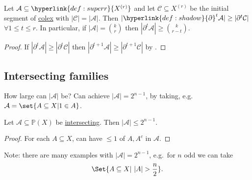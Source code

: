 \documentclass{article}
\newcommand{\A}{\mathcal{A}}
\newcommand{\named}[1]{\textbf{#1}\index{#1}}
\let\subset\subseteq
\begin{document}
\begin{ncor}\label{cor:9}
  Let $\mathcal{A} \subset \hyperlink{def:superr}{X^{(r)}}$ and let $\mathcal{C} \subset X^{(r)}$ be the initial segment of \hyperlink{def:colex}{colex} with $|\mathcal{C}| = |\mathcal{A}|$.
  Then $|\hyperlink{def:shadow}{\partial}^t \mathcal{A}| \geq |\partial^t \mathcal{C}|$ $\forall 1 \leq t \leq r$.
  In particular, if $|\mathcal{A}| = \binom{k}{r}$ then $|\partial^t \mathcal{A}| \geq \binom{k}{r-t}$.
\end{ncor}
\begin{proof}
  If $|\partial^t \mathcal{A}| \geq |\partial^t \mathcal{C}|$ then $|\partial^{t+1} \mathcal{A}| \geq |\partial^{t+1} \mathcal{C}|$ by .
\end{proof}

\subsection{Intersecting families}
How large can $|\mathcal{A}|$ be?
Can achieve $|\mathcal{A}| = 2^{n-1}$, by taking, e.g.\ $\mathcal{A} = \set{A \subset X | 1 \in A}$.
\begin{nprop}\label{prop:10}
  Let $\mathcal{A} \subset \mathbb{P}(X)$ be \hyperlink{def:inter}{intersecting}.
  Then $|\A| \leq 2^{n-1}$.
\end{nprop}
\begin{proof}
  For each $A \subset X$, can have $\leq 1$ of $A, A^c$ in $\mathcal{A}$.
\end{proof}
Note: there are many examples with $|\A| = 2^{n-1}$, e.g.\ for $n$ odd we can take \begin{equation*}\Set{A \subset X |\ |A| > \frac{n}{2}}.\end{equation*}
\end{document}
